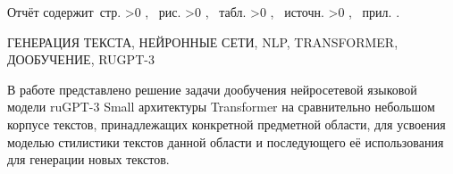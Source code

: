 \Referat

Отчёт содержит \pageref{LastPage}\,стр.%
\ifnum \totfig >0
, \totfig~рис.%
\fi
\ifnum \tottab >0
, \tottab~табл.%
\fi
%
\ifnum \totbib >0
, \totbib~источн.%
\fi
%
\ifnum \totapp >0
, \totapp~прил.%
\else
.%
\fi

ГЕНЕРАЦИЯ ТЕКСТА, НЕЙРОННЫЕ СЕТИ, NLP, TRANSFORMER, ДООБУЧЕНИЕ, RUGPT-3

В работе представлено решение задачи дообучения нейросетевой языковой модели ruGPT-3 Small архитектуры Transformer на сравнительно небольшом корпусе текстов, принадлежащих конкретной предметной области, для усвоения моделью стилистики текстов данной области и последующего её использования для генерации новых текстов.
